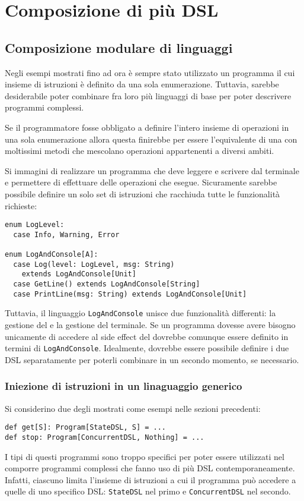 \section{Composizione di più DSL}

\subsection{Composizione modulare di linguaggi}
Negli esempi mostrati fino ad ora è sempre stato utilizzato un programma il cui insieme di istruzioni è definito da una sola enumerazione. Tuttavia, sarebbe desiderabile poter combinare fra loro più linguaggi di base per poter descrivere programmi complessi.

Se il programmatore fosse obbligato a definire l'intero insieme di operazioni in una sola enumerazione allora questa finirebbe per essere l'equivalente di una  con moltissimi metodi che mescolano operazioni appartenenti a diversi ambiti.

Si immagini di realizzare un programma che deve leggere e scrivere dal terminale e permettere di effettuare  delle operazioni che esegue. Sicuramente sarebbe possibile definire un solo set di istruzioni che racchiuda tutte le funzionalità richieste:
\begin{lstlisting}[language=scala3]
enum LogLevel:
  case Info, Warning, Error

enum LogAndConsole[A]:
  case Log(level: LogLevel, msg: String)
    extends LogAndConsole[Unit]
  case GetLine() extends LogAndConsole[String]
  case PrintLine(msg: String) extends LogAndConsole[Unit]
\end{lstlisting}
Tuttavia, il linguaggio \lstinline{LogAndConsole} unisce due funzionalità differenti: la gestione del  e la gestione del terminale.
Se un programma dovesse avere bisogno unicamente di accedere al side effect del  dovrebbe comunque essere definito in termini di \lstinline{LogAndConsole}.
Idealmente, dovrebbe essere possibile definire i due DSL separatamente per poterli combinare in un secondo momento, se necessario.

\subsubsection{Iniezione di istruzioni in un linaguaggio generico}
Si considerino due degli  mostrati come esempi nelle sezioni precedenti:
\begin{lstlisting}[language=scala3]
def get[S]: Program[StateDSL, S] = ...
def stop: Program[ConcurrentDSL, Nothing] = ...
\end{lstlisting}
I tipi di questi programmi sono troppo specifici per poter essere utilizzati nel comporre programmi complessi che fanno uso di più DSL contemporaneamente. Infatti, ciascuno limita l'insieme di istruzioni a cui il programma può accedere a quelle di uno specifico DSL: \lstinline{StateDSL} nel primo e \lstinline{ConcurrentDSL} nel secondo.


